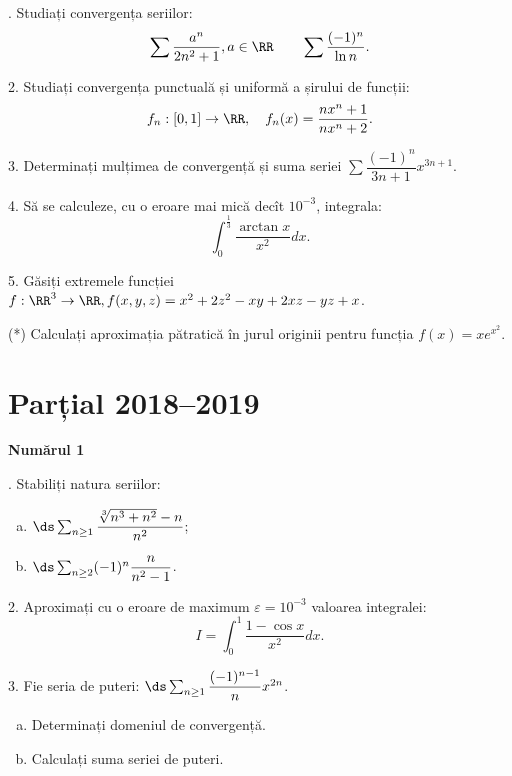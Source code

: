 \indent{}. Studiați convergența seriilor:
\[
  \sum \dfrac{a^n}{2n^2 + 1}, a \in \RR \qquad \sum \dfrac{(-1)^n}{\ln n}.
\]

\vspace{0.5cm}

2. Studiați convergența punctuală și uniformă a șirului de funcții:
\[
  f_n : [0, 1] \to \RR, \quad f_n(x) = \dfrac{nx^n + 1}{nx^n + 2}.
\]

\vspace{0.5cm}

3. Determinați mulțimea de convergență și suma seriei $ \sum \dfrac{(-1)^n}{3n + 1} x^{3n+1} $.

\vspace{0.5cm}

4. Să se calculeze, cu o eroare mai mică decît $ 10^{-3} $, integrala:
\[
  \int_0^{\frac{1}{3}} \dfrac{\arctan x}{x^2} dx.
\]

\vspace{0.5cm}

5. Găsiți extremele funcției $ f : \RR^3 \to \RR, f(x, y, z) = x^2 + 2z^2 - xy + 2xz - yz + x$.

\vspace{0.5cm}

(*) Calculați aproximația pătratică în jurul originii pentru funcția
$ f(x) = xe^{x^2} $.


\section{Parțial 2018--2019}

\textbf{Numărul 1}

\indent{}. Stabiliți natura seriilor:
\begin{enumerate}[(a)]
\item $ \ds\sum_{n \geq 1} \dfrac{\sqrt[3]{n^3 + n^2} - n}{n^2} $;
\item $ \ds\sum_{n \geq 2} (-1)^n \dfrac{n}{n^2 - 1} $.
\end{enumerate}

\vspace{0.5cm}

2. Aproximați cu o eroare de maximum $ \varepsilon = 10^{-3} $ valoarea integralei:
\[
  I = \int_0^1 \dfrac{1 - \cos x}{x^2} dx.
\]

\vspace{0.5cm}

3. Fie seria de puteri: $ \ds\sum_{n \geq 1} \dfrac{(-1)^{n-1}}{n} x^{2n} $.
\begin{enumerate}[(a)]
\item Determinați domeniul de convergență.
\item Calculați suma seriei de puteri.
\end{enumerate}


